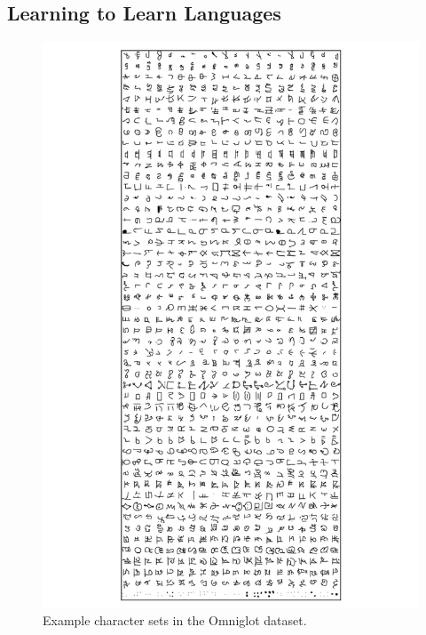 \documentclass{article}
\begin{document}
\subsection{Learning to Learn Languages}

\begin{figure}[h!]
\begin{center}
\includegraphics[width=\columnwidth, clip, trim=5cm 23cm 5cm 1cm]{../experiments/Feb_1_learning_alphabet_corr/5/all_alphabets.png}
\caption{Example character sets in the Omniglot dataset.}
\label{fig:omniglot}
\end{center}
\end{figure} 
\end{document}
